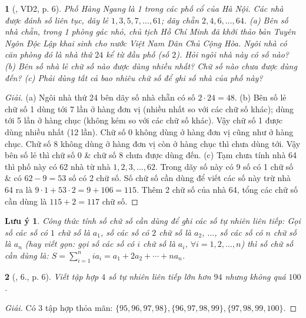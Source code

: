 \documentclass{article}
\newtheorem{baitoan}{}
\newtheorem{luuy}{Lưu ý}
\begin{document}
\begin{baitoan}[\cite{Tuyen_Toan_6}, VD2, p. 6]
	Phố Hàng Ngang là 1 trong các phố cổ của Hà Nội. Các nhà được đánh số liên tục, dãy lẻ $1,3,5,7,\ldots,61$; dãy chẵn $2,4,6,\ldots,64$. (a) Bên số nhà chẵn, trong 1 phòng gác nhỏ, chủ tịch Hồ Chí Minh đã khởi thảo bản Tuyên Ngôn Độc Lập khai sinh cho nước Việt Nam Dân Chủ Cộng Hòa. Ngôi nhà có căn phòng đó là nhà thứ $24$ kể từ đầu phố (số $2$). Hỏi ngôi nhà này có số nào? (b) Bên số nhà lẻ chữ số nào được dùng nhiều nhất? Chữ số nào chưa được dùng đến? (c) Phải dùng tất cả bao nhiêu chữ số để ghi số nhà của phố này?
\end{baitoan}

\begin{proof}[Giải]
	(a) Ngôi nhà thứ 24 bên dãy số nhà chẵn có số $2\cdot24 = 48$. (b) Bên số lẻ chữ số 1 dùng tới 7 lần ở hàng đơn vị (nhiều nhất so với các chữ số khác); dùng tới 5 lần ở hàng chục (không kém so với các chữ số khác). Vậy chữ số 1 được dùng nhiều nhất (12 lần). Chữ số 0 không dùng ở hàng đơn vị cũng như ở hàng chục. Chữ số 8 không dùng ở hàng đơn vị còn ở hàng chục thì chưa dùng tới. Vậy bên số lẻ thì chữ số 0 \& chữ số 8 chưa được dùng đến. (c) Tạm chưa tính nhà 64 thì phố này có 62 nhà từ nhà $1,2,3,\ldots,62$. Trong dãy số này có 9 số có 1 chữ số \& có $62 - 9 = 53$ số có 2 chữ số. Số chữ số cần dùng để viết các số này trừ nhà 64 ra là $9\cdot1 + 53\cdot2 = 9 + 106 = 115$. Thêm 2 chữ số của nhà 64, tổng các chữ số cần dùng là $115 + 2 = 117$ chữ số.
\end{proof}

\begin{luuy}
	Công thức tính số chữ số cần dùng để ghi các số tự nhiên liên tiếp: Gọi số các số có $1$ chữ số là $a_1$, số các số có $2$ chữ số là $a_2$, $\ldots$,  số các số có $n$ chữ số là $a_n$ (hay viết gọn: gọi số các số có $i$ chữ số là $a_i$, $\forall i = 1,2,\ldots,n$) thì số chữ số cần dùng là: $S = \sum_{i=1}^n ia_i = a_1 + 2a_2 + \cdots + na_n$.
\end{luuy}

\begin{baitoan}[\cite{Tuyen_Toan_6}, 6., p. 6]
	Viết tập hợp $4$ số tự nhiên liên tiếp lớn hơn $94$ nhưng không quá $100$.
\end{baitoan}

\begin{proof}[Giải]
	Có 3 tập hợp thỏa mãn: $\{95,96,97,98\},\{96,97,98,99\},\{97,98,99,100\}$.
\end{proof}
\end{document}
